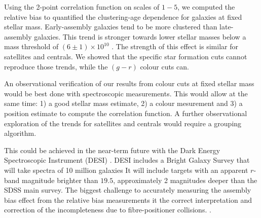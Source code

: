 \documentclass{aa}
\begin{document}
Using the 2-point correlation function on scales of $1-5$\Mpch, 
we computed the relative bias to  quantified the clustering-age
dependence for galaxies at fixed stellar mass.
Early-assembly galaxies tend to be more clustered than late-assembly galaxies.
This trend is stronger towards lower stellar masses below a mass
threshold of $(6\pm1)\times 10^{10}$ \Msunh.  
The strength of this effect is similar for satellites and centrals. 
We showed that the specific star formation cuts cannot reproduce those
trends, while the $(g-r)$ colour cuts can. 

An observational verification of our results from colour cuts at
fixed stellar mass would be best done with spectroscopic
measurements. 
This would allow at the same time: 1) a good stellar mass estimate,
2) a colour mesurement and 3) a position estimate to compute the
correlation function.
A further observational exploration of the trends for satellites and
centrals would require a grouping algorithm.

This could be achieved in the near-term future with the Dark Energy Spectroscopic
Instrument (DESI) \citep{2016arXiv161100036D}. 
DESI includes a Bright Galaxy Survey that will take spectra of
10 million galaxies 
It will include  targets with an apparent $r$-band magnitude brighter
than $19.5$, approximately 2 magnitudes deeper than the SDSS
main survey.  
The biggest challenge to accurately measuring the assembly bias effect
from the relative bias measurements it the  correct interpretation and
correction of the incompleteness due to fibre-positioner collisions.
\citep{2019MNRAS.484.1285S}.  




\end{document}
